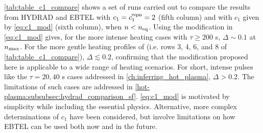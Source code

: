\autoref{tab:table_c1_compare} shows a set of runs carried out to compare the results from HYDRAD and EBTEL with $c_1=c_1^\textup{eqm}=2$ (fifth column) and with $c_1$ given by \autoref{eq:c1_mod} (sixth column), when $n<n_\textup{eq}$. Using the modification in \autoref{eq:c1_mod} gives, for the more intense heating cases with $\tau\ge200$ s, $\Delta\sim0.1$ at $n_\textup{max}$. For the more gentle heating profiles of \citet{cargill_enthalpy-based_2012,bradshaw_influence_2013} (i.e. rows 3, 4, 6, and 8 of \autoref{tab:table_c1_compare}), $\Delta\lesssim0.2$, confirming that the modification proposed here is applicable to a wide range of heating scenarios. For short, intense pulses like the $\tau=20,40$ s cases addressed in \autoref{ch:inferring_hot_plasma}, $\Delta>0.2$. The limitations of such cases are addressed in \autoref{hot-plasma:subsubsec:hydrad_comparison_sf}. \autoref{eq:c1_mod} is motivated by simplicity while including the essential physics. Alternative, more complex determinations of $c_1$ have been considered, but involve limitations on how EBTEL can be used both now and in the future.

